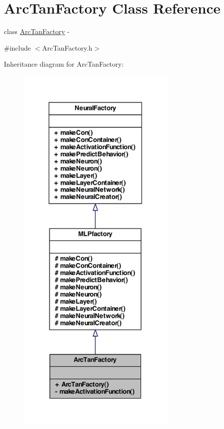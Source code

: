 \hypertarget{class_arc_tan_factory}{
\section{ArcTanFactory Class Reference}
\label{class_arc_tan_factory}
}


class \hyperlink{class_arc_tan_factory}{ArcTanFactory} -\/  




{\ttfamily \#include $<$ArcTanFactory.h$>$}



Inheritance diagram for ArcTanFactory:\nopagebreak
\begin{figure}[H]
\begin{center}
\leavevmode
\includegraphics[width=222pt]{class_arc_tan_factory__inherit__graph}
\end{center}
\end{figure}


